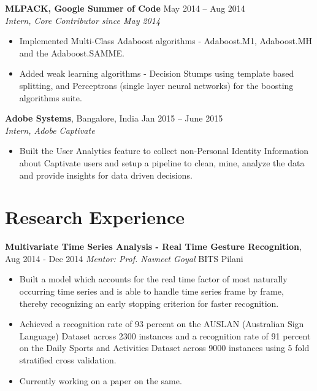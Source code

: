 \documentclass[letterpaper]{article}
\begin{document}
\vspace{-0.6mm}
\textbf{MLPACK, Google Summer of Code} \hfill May 2014 -- Aug 2014\\
\emph{Intern, Core Contributor since May 2014}\\
\vspace{-6mm}
\begin{itemize}
\item Implemented Multi-Class Adaboost algorithms - Adaboost.M1, Adaboost.MH and the Adaboost.SAMME.
\vspace{-2mm}
\item Added weak learning algorithms - Decision Stumps using template based splitting, and Perceptrons (single layer neural networks) for the boosting algorithms suite.
\end{itemize}

\vspace{-0.5mm}
\textbf{Adobe Systems}, Bangalore, India \hfill Jan 2015 -- June 2015\\
\emph{Intern, Adobe Captivate}\\
\vspace{-6mm}
\begin{itemize}
\item Built the User Analytics feature to collect non-Personal Identity Information about Captivate users and setup a pipeline to clean, mine, analyze the data and provide insights for data driven decisions.
\end{itemize}

\section*{Research Experience}
\textbf{Multivariate Time Series Analysis - Real Time Gesture Recognition},  \hfill
Aug 2014 - Dec 2014
\emph{Mentor: Prof. Navneet Goyal} \hfill
BITS Pilani\\
\vspace{-6mm}
\begin{itemize}
\item Built a model which accounts for the real time factor of most naturally occurring time series and is able to handle time series frame by frame, thereby recognizing an early stopping criterion for faster recognition. 
\vspace{-2mm}
\item Achieved a recognition rate of 93 percent on the AUSLAN (Australian Sign Language) Dataset across 2300 instances and a recognition rate of 91 percent on the Daily Sports and Activities Dataset across 9000 instances using 5 fold stratified cross validation.
\vspace{-2mm}
\item Currently working on a paper on the same.
\end{itemize}
\end{document}
